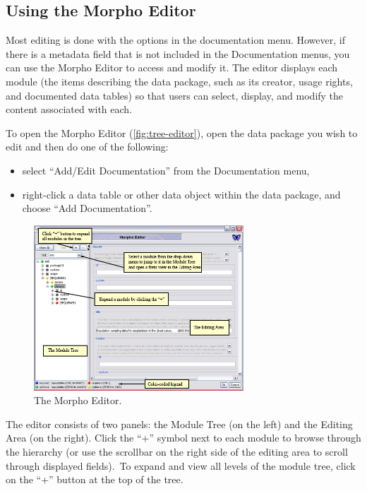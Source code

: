\subsection{Using the Morpho Editor} \label{sec:edit-doc-tree}

Most editing is done with the options in the documentation menu.
However, if there is a metadata field that is not included in the
Documentation menus, you can use the Morpho Editor to access and modify
it. The editor displays each module (the items describing the data
package, such as its creator, usage rights, and documented data tables)
so that users can select, display, and modify the content associated
with each.

To open the Morpho Editor (\autoref{fig:tree-editor}), open the data
package you wish to edit and then do one of the following:
\begin{itemize}
  \setlength{\parskip}{1pt}
  \item select ``Add/Edit Documentation'' from the Documentation menu,
  \item right-click a data table or other data object within the data
    package, and choose ``Add Documentation''. 
\end{itemize}

\begin{figure}
  \centering
    \includegraphics[width=0.7\textwidth]{images/tree-editor.jpg}
  \caption{The Morpho Editor.}
  \label{fig:tree-editor}
\end{figure}

The editor consists of two panels: the Module Tree (on the left) and the
Editing Area (on the right). Click the ``+'' symbol next to each module
to browse through the hierarchy (or use the scrollbar on the right side
of the editing area to scroll through displayed fields). To expand and
view all levels of the module tree, click on the ``+'' button at the top
of the tree. 

